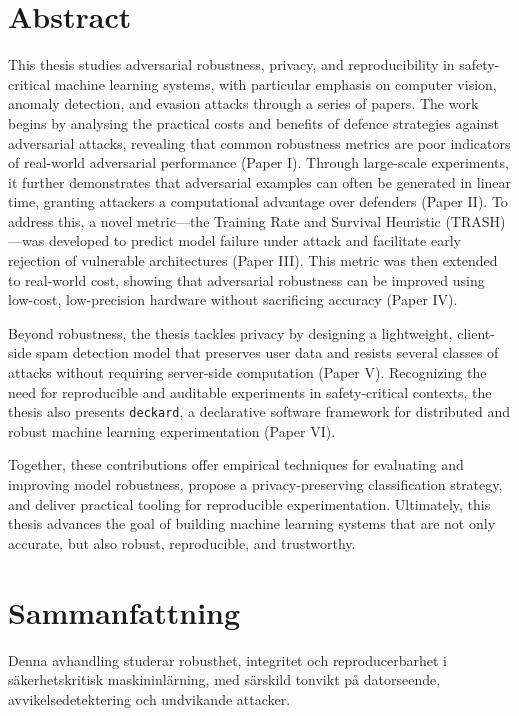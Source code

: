 \chapter*{Abstract}

This thesis studies adversarial robustness, privacy, and reproducibility in safety-critical machine learning systems, with particular emphasis on computer vision, anomaly detection, and evasion attacks through a series of papers.
The work begins by analysing the practical costs and benefits of defence strategies against adversarial attacks, revealing that common robustness metrics are poor indicators of real-world adversarial performance (Paper I). 
Through large-scale experiments, it further demonstrates that adversarial examples can often be generated in linear time, granting attackers a computational advantage over defenders (Paper II).
To address this, a novel metric—the Training Rate and Survival Heuristic (TRASH)—was developed to predict model failure under attack and facilitate early rejection of vulnerable architectures (Paper III).
This metric was then extended to real-world cost, showing that adversarial robustness can be improved using low-cost, low-precision hardware without sacrificing accuracy (Paper IV).

Beyond robustness, the thesis tackles privacy by designing a lightweight, client-side spam detection model that preserves user data and resists several classes of attacks without requiring server-side computation (Paper V).
Recognizing the need for reproducible and auditable experiments in safety-critical contexts, the thesis also presents \texttt{deckard}, a declarative software framework for distributed and robust machine learning experimentation (Paper VI).

Together, these contributions offer empirical techniques for evaluating and improving model robustness, propose a privacy-preserving classification strategy, and deliver practical tooling for reproducible experimentation. 
Ultimately, this thesis advances the goal of building machine learning systems that are not only accurate, but also robust, reproducible, and trustworthy.

\chapter*{Sammanfattning}

Denna avhandling studerar robusthet, integritet och reproducerbarhet i säker\-hetskritisk maskininlärning, med särskild tonvikt på datorseende, avvikelse\-detektering och undvikande attacker.

